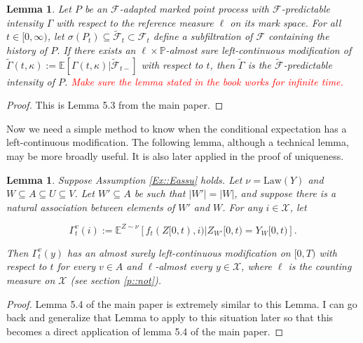\documentclass[12pt]{article}
\newcommand{\mb}{\mathbb}
\newcommand{\mc}{\mathcal}
\newcommand{\te}{\text}
\newcommand{\tr}{\textcolor{red}}
\newcommand{\pr}{\mb{P}}							%
\newcommand{\ex}[1]{\mb{E}\left[#1\right]}			%
\newcommand{\exmu}[2]{\mb{E}^{#1}\left[#2\right]}	%
\newcommand{\defeq}{:=}								%
\newcommand{\sta}{\mc{X}}							%
\newcommand{\Sm}{\ell}								%
\newcommand{\F}{\mc{F}}								%
\newcommand{\vind}[1]{_{#1}}						%
\newcommand{\tmi}[1]{#1}							%
\newcommand{\vpara}[1]{^{#1}}						%
\newcommand{\tpara}[1]{_{#1}}						%
\newcommand{\Xg}{Y}
\newcommand{\alt}[1]{\tilde{#1}}
\renewcommand{\mark}{\kappa}
\newcommand{\ratee}{\Gamma}
\newcommand{\rp}{P}
\newcommand{\mm}{\nu}
\newcommand{\cratee}{\alt{\ratee}}
\newcommand{\law}{\te{Law}}
\newcommand{\Xh}{Z}
\newtheorem{lem}[thms]{Lemma}
\begin{document}
\begin{lem}
Let \(\rp\) be an \(\F\)-adapted marked point process with \(\F\)-predictable intensity \(\ratee\) with respect to the reference measure \(\Sm\) on its mark space. For all \(t \in [0,\infty)\), let \(\sigma(\rp_{t}) \subseteq \alt{\F}_{t}\subset \F_{t}\) define a subfiltration of \(\F\) containing the history of \(\rp\). If there exists an \(\ell\times \pr\)-almost sure left-continuous modification of \(\cratee(t,\mark) := \ex{\ratee(t,\mark)|\alt{\F}_{t-}}\) with respect to \(t\), then \(\cratee\) is the \(\alt{\F}\)-predictable intensity of \(\rp\). \tr{Make sure the lemma stated in the book works for infinite time.}
\label{Ex::filtering}
\end{lem}

\begin{proof}
This is Lemma 5.3 from the main paper.
\end{proof}

Now we need a simple method to know when the conditional expectation has a left-continuous modification. The following lemma, although a technical lemma, may be more broadly useful. It is also later applied in the proof of uniqueness.


\begin{lem}
Suppose Assumption \ref{Ex::Eassu} holds. Let \(\mm = \law(\Xg)\) and \(W\subseteq A \subseteq U\subseteq V\). Let \(W'\subseteq A\) be such that \(|W'| = |W|\), and suppose there is a natural association between elements of \(W'\) and \(W\). For any \(i \in \sta\), let

\[\ratee\vpara{v}\tpara{t}(i) \defeq \exmu{\Xh\sim \mm}{f_t(\Xh\tmi{[0,t)},i)|\Xh\vind{W'}\tmi{[0,t)} = \Xg\vind{W}\tmi{[0,t)}}.\]

Then \(\ratee^{v}_{t}(y)\) has an almost surely left-continuous modification on \([0,T)\) with respect to \(t\) for every \(v \in A\) and \(\ell\)-almost every \(y \in \sta\), where \(\ell\) is the counting measure on \(\sta\) (see section \ref{p::not}).
\label{Ex::leftmod}
\end{lem}
\begin{proof}
Lemma 5.4 of the main paper is extremely similar to this Lemma. I can go back and generalize that Lemma to apply to this situation later so that this becomes a direct application of lemma 5.4 of the main paper.
\end{proof}
\end{document}
